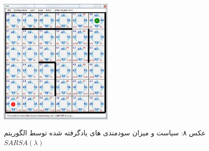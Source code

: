 \documentclass[10pt,a4paper]{article}
\begin{document}
\begin{figure}[H]
    \centering
    \includegraphics[width=0.5\textwidth]{rlambda}
    \begin{center}
    \textarabic{عکس ۸: سیاست و میزان سودمندی های یادگرفته شده توسط الگوریتم $SARSA(\lambda)$ }
    \end{center}
\end{figure}
\end{document}
